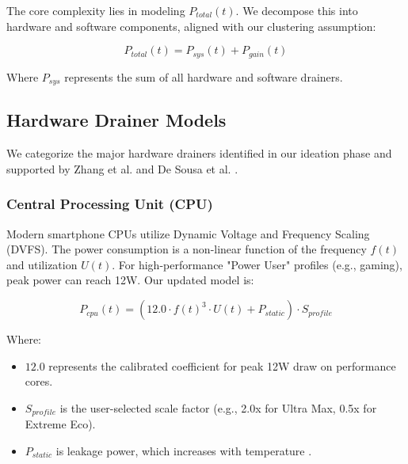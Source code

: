 \documentclass[12pt]{article}
\begin{document}
The core complexity lies in modeling $P_{total}(t)$. We decompose this into hardware and software components, aligned with our clustering assumption:

\begin{equation} \label{eq:total_power}
P_{total}(t) = P_{sys}(t) + P_{gain}(t)
\end{equation}

Where $P_{sys}$ represents the sum of all hardware and software drainers.

\newpage


\subsection{Hardware Drainer Models}

We categorize the major hardware drainers identified in our ideation phase and supported by Zhang et al. \cite{1} and De Sousa et al. \cite{2}.

\subsubsection{Central Processing Unit (CPU)}

Modern smartphone CPUs utilize Dynamic Voltage and Frequency Scaling (DVFS). The power consumption is a non-linear function of the frequency $f(t)$ and utilization $U(t)$. For high-performance "Power User" profiles (e.g., gaming), peak power can reach 12W. Our updated model is:

\begin{equation} \label{eq:cpu_power}
P_{cpu}(t) = \left( 12.0 \cdot f(t)^3 \cdot U(t) + P_{static} \right) \cdot S_{profile}
\end{equation}

Where:
\begin{itemize}
    \item $12.0$ represents the calibrated coefficient for peak 12W draw on performance cores.
    \item $S_{profile}$ is the user-selected scale factor (e.g., 2.0x for Ultra Max, 0.5x for Extreme Eco).
    \item $P_{static}$ is leakage power, which increases with temperature \cite{14}.
\end{itemize}
\end{document}
